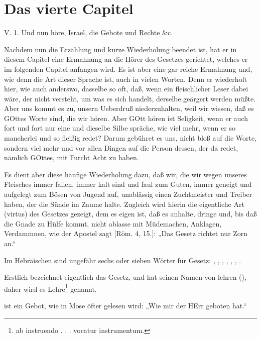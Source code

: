 \section{Das vierte Capitel}

\begin{schriftzitat}
V. 1. Und nun höre, Israel, die Gebote und Rechte \&c.
\end{schriftzitat}

Nachdem nun die Erzählung und kurze Wiederholung beendet ist, hat er in diesem Capitel eine Ermahnung an die Hörer des Gesetzes gerichtet, welches er im folgenden Capitel anfangen wird. Es ist aber eine gar reiche Ermahnung und, wie denn die Art dieser Sprache ist, auch in vielen Worten. Denn er wiederholt hier, wie auch anderswo, dasselbe so oft, daß, wenn ein fleischlicher Leser dabei wäre, der nicht versteht, um was es sich handelt, derselbe geärgert werden müßte. Aber uns kommt es zu, unsern Ueberdruß niederzuhalten, weil wir wissen, daß es GOttes Worte sind, die wir hören. Aber GOtt hören ist Seligkeit, wenn er auch fort und fort nur eine und dieselbe Silbe spräche, wie viel mehr, wenn er so mancherlei und so fleißig redet? Darum gebühret es uns, nicht bloß auf die Worte, sondern viel mehr und vor allen Dingen auf die Person dessen, der da redet, nämlich GOttes, mit Furcht Acht zu haben.

Es dient aber diese häufige Wiederholung dazu, daß wir, die wir wegen unseres Fleisches immer fallen, immer kalt sind und faul zum Guten, immer geneigt und aufgelegt zum Bösen von Jugend auf, unablässig einen Zuchtmeister und Treiber haben, der die Sünde im Zaume halte. Zugleich wird hierin die eigentliche Art (virtus) des Gesetzes gezeigt, dem es eigen ist, daß es anhalte, dringe und, bis daß die Gnade zu Hülfe kommt, nicht ablasse mit Müdemachen, Anklagen, Verdammnen, wie der Apostel sagt [Röm. 4, 15.]: „Das Gesetz richtet nur Zorn an.“

Im Hebräischen sind ungefähr sechs oder sieben Wörter für Gesetz: , , , , , , .

Erstlich  bezeichnet eigentlich das Gesetz, und hat seinen Namen von lehren (), daher wird es Lehre\footnote{ab instruendo . . . vocatur instrumentum.} genannt.

 ist ein Gebot, wie in Mose öfter gelesen wird: „Wie mir der HErr geboten hat.“

